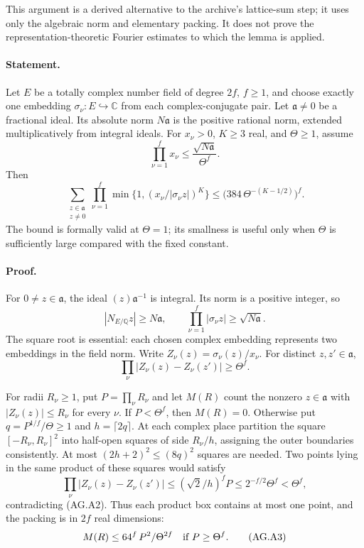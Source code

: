 \documentclass[11pt,a4paper]{article}
\numberwithin{equation}{section}
\theoremstyle{remark}\newtheorem{remark}[theorem]{Remark}
\begin{document}
This argument is a derived alternative to the archive's
lattice-sum step; it uses only the algebraic norm and elementary
packing.  It does not prove the representation-theoretic Fourier
estimates to which the lemma is applied.

\paragraph{Statement.}
Let \(E\) be a totally complex number field of degree \(2f\),
\(f\ge1\), and choose exactly one embedding
\(\sigma_\nu:E\hookrightarrow\mathbb C\) from each complex-conjugate
pair.  Let \(\mathfrak a\ne0\) be a fractional ideal.  Its absolute
norm \(N\mathfrak a\) is the positive rational norm, extended
multiplicatively from integral ideals.  For \(x_\nu>0\), \(K\ge3\)
real, and \(\Theta\ge1\), assume
\[
 \prod_{\nu=1}^{f}x_\nu\le
        \frac{\sqrt{N\mathfrak a}}{\Theta^f}.
\]
Then
\[
 \sum_{\substack{z\in\mathfrak a\\z\ne0}}
 \prod_{\nu=1}^{f}
       \min\{1,(x_\nu/|\sigma_\nu z|)^K\}
 \le \bigl(384\,\Theta^{-(K-1/2)}\bigr)^f.                 \tag{AG.A1}
\]
The bound is formally valid at \(\Theta=1\); its smallness is
useful only when \(\Theta\) is sufficiently large compared with
the fixed constant.

\paragraph{Proof.}
For \(0\ne z\in\mathfrak a\), the ideal
\((z)\mathfrak a^{-1}\) is integral.  Its norm is a positive
integer, so
\[
 |N_{E/\mathbb Q}z|\ge N\mathfrak a,\qquad
 \prod_{\nu=1}^{f}|\sigma_\nu z|\ge\sqrt{N\mathfrak a}.
\]
The square root is essential: each chosen complex embedding
represents two embeddings in the field norm.
Write \(Z_\nu(z)=\sigma_\nu(z)/x_\nu\).
For distinct \(z,z'\in\mathfrak a\),
\[
 \prod_\nu|Z_\nu(z)-Z_\nu(z')|\ge\Theta^f.                 \tag{AG.A2}
\]

For radii \(R_\nu\ge1\), put \(P=\prod_\nu R_\nu\) and let
\(M(R)\) count the nonzero \(z\in\mathfrak a\) with
\(|Z_\nu(z)|\le R_\nu\) for every \(\nu\).
If \(P<\Theta^f\), then \(M(R)=0\).
Otherwise put \(q=P^{1/f}/\Theta\ge1\) and
\(h=\lceil2q\rceil\).
At each complex place partition the square
\([-R_\nu,R_\nu]^2\) into half-open squares of side \(R_\nu/h\),
assigning the outer boundaries consistently.
At most \((2h+2)^2\le(8q)^2\) squares are needed.
Two points lying in the same product of these squares would
satisfy
\[
 \prod_\nu|Z_\nu(z)-Z_\nu(z')|
 \le(\sqrt2/h)^fP
 \le 2^{-f/2}\Theta^f<\Theta^f,
\]
contradicting (AG.A2).  Thus each product box contains at most
one point, and the packing is in \(2f\) real dimensions:
\[
 M(R)\le64^f\,P^2/\Theta^{2f}
       \quad\hbox{if }P\ge\Theta^f.                        \tag{AG.A3}
\]
\end{document}
